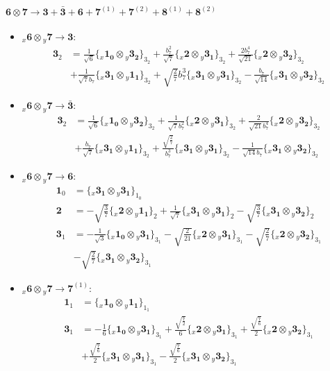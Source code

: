 \documentclass[english]{article}
\newcommand{\cgEqFontsize}{\large}
\newcommand{\rep}[1]{\mathbf{#1}}
\newcommand{\repx}[2]{{}_{#2}\mathbf{#1}}
\newcommand{\tsprod}[2]{\rep{#1}\otimes\rep{#2}}
\newcommand{\tsprodx}[2]{\repx{#1}{x}\otimes\repx{#2}{y}}
\newcommand{\subcgs}[3]{\big\{ \tsprodx{#1}{#2}\big\}^{}_{#3}}
\begin{document}
\paragraph*{\cgEqFontsize $\tsprod{6}{7}\to\rep{3}+\rep{\bar{3}}+\rep{6}+\rep{7}^{(1)}+\rep{7}^{(2)}+\rep{8}^{(1)}+\rep{8}^{(2)}$}
\begin{itemize}
\item $\tsprodx{6}{7}\to\rep{3}$:
\begin{align*}
\rep{3}_{2} & = \frac{1}{\sqrt{6}}\subcgs{1_{0}}{3_{2}}{3_{2}}+\frac{b_7^2}{\sqrt{7}}\subcgs{2}{3_{1}}{3_{2}}+\frac{2 b_7^4}{\sqrt{21}}\subcgs{2}{3_{2}}{3_{2}} \\ 
 & +\frac{1}{\sqrt{7} b_7}\subcgs{3_{1}}{1_{1}}{3_{2}}+\sqrt{\frac{2}{7}} b_7^3\subcgs{3_{1}}{3_{1}}{3_{2}}-\frac{b_7}{\sqrt{14}}\subcgs{3_{1}}{3_{2}}{3_{2}}
\end{align*}
\item $\tsprodx{6}{7}\to\rep{\bar{3}}$:
\begin{align*}
\rep{3}_{2} & = \frac{1}{\sqrt{6}}\subcgs{1_{0}}{3_{2}}{3_{2}}+\frac{1}{\sqrt{7} b_7^2}\subcgs{2}{3_{1}}{3_{2}}+\frac{2}{\sqrt{21} b_7^4}\subcgs{2}{3_{2}}{3_{2}} \\ 
 & +\frac{b_7}{\sqrt{7}}\subcgs{3_{1}}{1_{1}}{3_{2}}+\frac{\sqrt{\frac{2}{7}}}{b_7^3}\subcgs{3_{1}}{3_{1}}{3_{2}}-\frac{1}{\sqrt{14} b_7}\subcgs{3_{1}}{3_{2}}{3_{2}}
\end{align*}
\item $\tsprodx{6}{7}\to\rep{6}$:
\begin{align*}
\rep{1}_{0} & = \subcgs{3_{1}}{3_{1}}{1_{0}}
\\
\rep{2} & = -\sqrt{\frac{3}{7}}\subcgs{2}{1_{1}}{2}+\frac{1}{\sqrt{7}}\subcgs{3_{1}}{3_{1}}{2}-\sqrt{\frac{3}{7}}\subcgs{3_{1}}{3_{2}}{2}
\\
\rep{3}_{1} & = -\frac{1}{\sqrt{3}}\subcgs{1_{0}}{3_{1}}{3_{1}}-\sqrt{\frac{2}{21}}\subcgs{2}{3_{1}}{3_{1}}-\sqrt{\frac{2}{7}}\subcgs{2}{3_{2}}{3_{1}} \\ 
 & -\sqrt{\frac{2}{7}}\subcgs{3_{1}}{3_{2}}{3_{1}}
\end{align*}
\item $\tsprodx{6}{7}\to\rep{7}^{(1)}$:
\begin{align*}
\rep{1}_{1} & = \subcgs{1_{0}}{1_{1}}{1_{1}}
\\
\rep{3}_{1} & = -\frac{1}{6}\subcgs{1_{0}}{3_{1}}{3_{1}}+\frac{\sqrt{\frac{7}{2}}}{6}\subcgs{2}{3_{1}}{3_{1}}+\frac{\sqrt{\frac{7}{6}}}{2}\subcgs{2}{3_{2}}{3_{1}} \\ 
 & +\frac{\sqrt{\frac{7}{6}}}{2}\subcgs{3_{1}}{3_{1}}{3_{1}}-\frac{\sqrt{\frac{7}{6}}}{2}\subcgs{3_{1}}{3_{2}}{3_{1}}

\end{align*}
\end{itemize}
\end{document}
